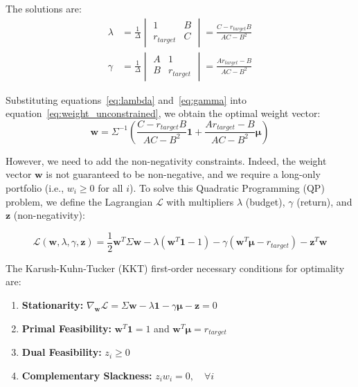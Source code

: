 \documentclass[11pt,a4paper]{article}
\begin{document}
The solutions are:
\begin{align}
\lambda &= \frac{1}{\Delta} \begin{vmatrix}
1 & B \\
r_{target} & C
\end{vmatrix} = \frac{C - r_{target}B}{AC - B^2} \label{eq:lambda} \\
\gamma &= \frac{1}{\Delta} \begin{vmatrix}
A & 1 \\
B & r_{target}
\end{vmatrix} = \frac{Ar_{target} - B}{AC - B^2} \label{eq:gamma}
\end{align}


Substituting equations~\eqref{eq:lambda} and~\eqref{eq:gamma} into equation~\eqref{eq:weight_unconstrained}, we obtain the optimal weight vector:
\begin{equation}
\mathbf{w} = \Sigma^{-1}\left(\frac{C - r_{target}B}{AC - B^2} \mathbf{1} + \frac{Ar_{target} - B}{AC - B^2} \bm{\mu}\right)
\end{equation}

However, we need to add the non-negativity constraints. Indeed, the weight vector $\mathbf{w}$ is not guaranteed to be non-negative, and we require a long-only portfolio (i.e., $w_i \geq 0$ for all $i$). To solve this Quadratic Programming (QP) problem, we define the Lagrangian $\mathcal{L}$ with multipliers $\lambda$ (budget), $\gamma$ (return), and $\mathbf{z}$ (non-negativity):


\begin{equation}
\mathcal{L}(\mathbf{w}, \lambda, \gamma, \mathbf{z}) = \frac{1}{2} \mathbf{w}^T \Sigma \mathbf{w} - \lambda(\mathbf{w}^T \mathbf{1} - 1) - \gamma(\mathbf{w}^T \bm{\mu} - r_{target}) - \mathbf{z}^T \mathbf{w}
\end{equation}


The Karush-Kuhn-Tucker (KKT) first-order necessary conditions for optimality are:
\begin{enumerate}
    \item \textbf{Stationarity:} $\nabla_{\mathbf{w}} \mathcal{L} = \Sigma \mathbf{w} - \lambda \mathbf{1} - \gamma \bm{\mu} - \mathbf{z} = 0$
    \item \textbf{Primal Feasibility:} $\mathbf{w}^T \mathbf{1} = 1$ and $\mathbf{w}^T \bm{\mu} = r_{target}$
    \item \textbf{Dual Feasibility:} $z_i \geq 0$
    \item \textbf{Complementary Slackness:} $z_i w_i = 0, \quad \forall i$
\end{enumerate}
\end{document}
